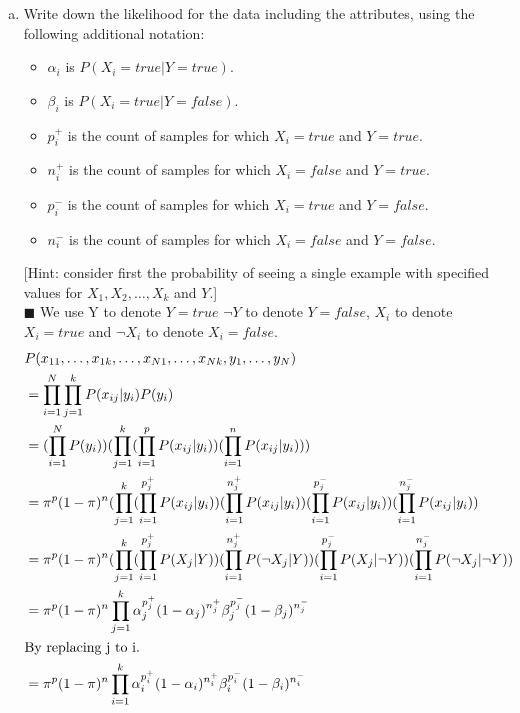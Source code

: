 \documentclass{article}
\newcommand{\solution}[1]{~\\ $\blacksquare$ \sffamily\upshape\selectfont #1
\normalfont ~\\~ }
\begin{document}
\begin{enumerate}[a.]
{\begin{figure}[ht]
    \caption{Bayesian Network for question c.}\label{fig:20_1c}
  \end{figure}
}
\item Write down the likelihood for the data including the attributes,
using the following additional notation:
\begin{itemize}
\item $\alpha_i$ is $P(X_i=true|Y=true)$.
\item $\beta_i$ is $P(X_i = true|Y = false)$.
\item $p_i^+$ is the count of samples for which $X_i = true$ and $Y = true$.
\item $n_i^+$ is the count of samples for which $X_i = false$ and $Y = true$.
\item $p_i^-$ is the count of samples for which $X_i = true$ and $Y = false$.
\item $n_i^-$ is the count of samples for which $X_i = false$ and $Y = false$.
\end{itemize}

[Hint: consider first the probability of seeing a single example with
specified values for $X_1, X_2,\ldots,X_k$ and $Y$.]
\solution{
  We use Y to denote $Y=true$ $\neg Y$ to denote $Y=false$, $X_i$ to denote
  $X_i=true$ and $\neg X_i$ to denote $X_i=false$. 
  \begin{align*}
    & P(x_{11},\ldots,x_{1k},\ldots,x_{N1},\ldots,x_{Nk},y_1,\ldots,y_N) \\
    & = \prod_{i=1}^N\prod_{j=1}^kP(x_{ij}|y_i)P(y_i) \\
    & = (\prod_{i=1}^NP(y_i))(\prod_{j=1}^k(\prod_{i=1}^pP(x_{ij}|y_i))(\prod_{i=1}^nP(x_{ij}|y_i))) \\
    & = \pi^p(1-\pi)^n(\prod_{j=1}^k(\prod_{i=1}^{p_j^+}P(x_{ij}|y_i))(\prod_{i=1}^{n_j^+}P(x_{ij}|y_i)) 
    (\prod_{i=1}^{p_j^-}P(x_{ij}|y_i))(\prod_{i=1}^{n_j^-}P(x_{ij}|y_i)) \\
    & = \pi^p(1-\pi)^n(\prod_{j=1}^k(\prod_{i=1}^{p_j^+}P(X_j|Y))(\prod_{i=1}^{n_j^+}P(\neg X_j|Y)) 
    (\prod_{i=1}^{p_j^-}P(X_j|\neg Y))(\prod_{i=1}^{n_j^-}P(\neg X_j|\neg Y)) \\
    & = \pi^p(1-\pi)^n\prod_{j=1}^k\alpha_j^{p_j^+}(1-\alpha_j)^{n_j^+}\beta_j^{p_j^-}(1-\beta_j)^{n_j^-} \\
    &\mbox{\rmfamily\selectfont{By replacing j to i.}\normalfont} \\
    & = \pi^p(1-\pi)^n\prod_{i=1}^k\alpha_i^{p_i^+}(1-\alpha_i)^{n_i^+}\beta_i^{p_i^-}(1-\beta_i)^{n_i^-} 
  \end{align*}
}


\end{enumerate}
\end{document}
